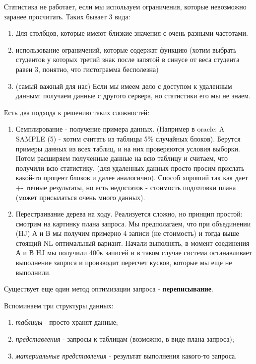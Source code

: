 \begin{itemize}
Статистика не работает, если мы используем ограничения, которые невозможно заранее просчитать. Таких бывает 3 вида: 
\begin{enumerate}
    \item Для столбцов, которые имеют близкие значения с очень разными частотами.
    \item использование ограничений, которые содержат функцию (хотим выбрать студентов у которых третий знак после запятой в синусе от веса студента равен 3, понятно, что гистограмма бесполезна) 
    \item (самый важный для нас) Если мы имеем дело с доступом к удаленным данным: получаем данные с другого сервера, но статистики его мы не знаем.
\end{enumerate}

Есть два подхода к решению таких сложностей: 

\begin{enumerate}
    \item Семплирование - получение примера данных. (Например в oracle: A SAMPLE (5) - хотим считать из таблицы 5\% случайных блоков). Берутся примеры данных из всех таблиц, и на них проверяются условия выборки. Потом расширяем полученные данные на всю таблицу и считаем, что получили всю статистику. (для удаленных данных просто просим прислать какой-то процент блоков и далее аналогично). Способ хороший так как дает +- точные результаты, но есть недостаток - стоимость подготовки плана (может присылаться очень много данных).
    \item Перестраивание дерева на ходу. Реализуется сложно, но принцип простой:  смотрим на картинку плана запроса. Мы предполагаем, что при объединении (HJ) А и В мы получим примерно 4 записи (не стоимость) и тогда выше стоящий NL оптимальный вариант. Начали выполнять, в момент соединения А и В HJ мы получили 400к записей и в таком случае система останавливает выполнение запроса и производит пересчет кусков, которые мы еще не выполнили.
\end{enumerate}
\end{itemize}

Существует еще один метод оптимизации запроса - \textbf{переписывание}. 

Вспоминаем три структуры данных: 

\begin{enumerate}
    \item \textit{таблицы} - просто хранят данные;
    \item  \textit{представления} - запросы к таблицам (возможно, в виде плана запроса);
    \item \textit{материальные представления} - результат выполнения какого-то запроса. 
\end{enumerate}

